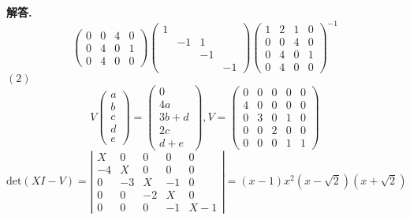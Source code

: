 \documentclass[10pt, a4paper, oneside]{article}
\newenvironment{solution}{\par\noindent\textbf{解答. }}{\par}
\begin{document}
\begin{CJK}{UTF8}{gbsn}
\begin{solution}
$$\begin{pmatrix}
    0 & 0 & 4 & 0 \\ 
    0 & 4 & 0 & 1 \\
    0 & 4 & 0 & 0
  \end{pmatrix}\begin{pmatrix}
    1 \\
    & -1 & 1 \\
    && -1 \\
    &&&-1 
  \end{pmatrix}\begin{pmatrix}
    1 & 2 & 1 & 0 \\
    0 & 0 & 4 & 0 \\ 
    0 & 4 & 0 & 1 \\
    0 & 4 & 0 & 0
  \end{pmatrix}^{-1}$$ \newline
  $(2)$ 
  $$V\begin{pmatrix}
    a \\ b \\ c \\ d \\ e 
  \end{pmatrix} = \begin{pmatrix}
    0 \\ 4a \\ 3b + d \\ 2c \\  d + e
  \end{pmatrix}, V = \begin{pmatrix}
    0 & 0 & 0 & 0 & 0 \\
    4 & 0 & 0 & 0 & 0 \\ 
    0 & 3 & 0 & 1 & 0 \\
    0 & 0 & 2 & 0 & 0 \\
    0 & 0 & 0 & 1 & 1
  \end{pmatrix}$$
  $$ \text{det}(XI-V) = \left| \begin{matrix}
    X & 0 & 0 & 0 & 0 \\
    -4 & X & 0 & 0 & 0 \\
    0 & -3 & X & -1 & 0 \\
    0  & 0 & -2 & X & 0 \\
    0 & 0 & 0 & -1 & X-1
  \end{matrix}\right| = (x-1)x^2(x-\sqrt{2}) (x+\sqrt{2}) $$ 
  \begin{table}[h!]
    \begin{center}
      \label{tab:table2}
      \begin{tabular}{l|c} %

\end{tabular}
\end{center}
\end{table}
\end{solution}
\end{CJK}
\end{document}
